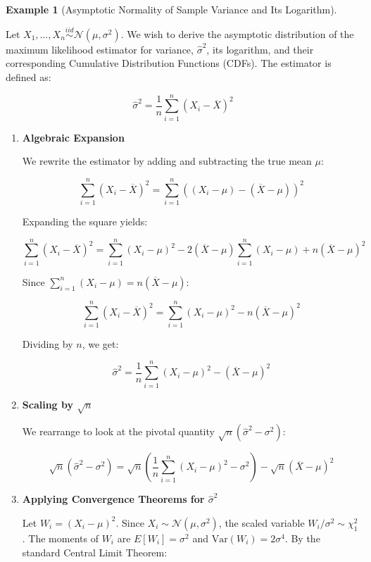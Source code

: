 \documentclass[
  letterpaper,
  DIV=11,
  numbers=noendperiod]{scrreprt}
\renewcommand{\[}{\begin{equation}}
\renewcommand{\]}{\end{equation}}
\theoremstyle{definition}
\theoremstyle{plain}
\theoremstyle{plain}
\theoremstyle{plain}
\theoremstyle{definition}
\newtheorem{example}{Example}[chapter]
\theoremstyle{plain}
\theoremstyle{remark}
\begin{document}
\begin{example}[Asymptotic Normality of Sample Variance and Its
Logarithm]\protect\hypertarget{exm-asymptotic-normal-variance}{}\label{exm-asymptotic-normal-variance}

Let \(X_1, \dots, X_n \overset{iid}{\sim} \mathcal{N}(\mu, \sigma^2)\).
We wish to derive the asymptotic distribution of the maximum likelihood
estimator for variance, \(\hat{\sigma}^2\), its logarithm, and their
corresponding Cumulative Distribution Functions (CDFs). The estimator is
defined as:

\[
\hat{\sigma}^2 = \frac{1}{n}\sum_{i=1}^n (X_i - \overline{X})^2
\]

\begin{enumerate}
\def\labelenumi{\arabic{enumi}.}
\item
  \textbf{Algebraic Expansion}

  We rewrite the estimator by adding and subtracting the true mean
  \(\mu\):

  \[
  \sum_{i=1}^n (X_i - \overline{X})^2 = \sum_{i=1}^n ((X_i - \mu) - (\overline{X} - \mu))^2
  \]

  Expanding the square yields:

  \[
  \sum_{i=1}^n (X_i - \overline{X})^2 = \sum_{i=1}^n (X_i - \mu)^2 - 2(\overline{X} - \mu)\sum_{i=1}^n(X_i - \mu) + n(\overline{X} - \mu)^2
  \]

  Since \(\sum_{i=1}^n(X_i - \mu) = n(\overline{X} - \mu)\):

  \[
  \sum_{i=1}^n (X_i - \overline{X})^2 = \sum_{i=1}^n (X_i - \mu)^2 - n(\overline{X} - \mu)^2
  \]

  Dividing by \(n\), we get:

  \[
  \hat{\sigma}^2 = \frac{1}{n}\sum_{i=1}^n (X_i - \mu)^2 - (\overline{X} - \mu)^2
  \]
\item
  \textbf{Scaling by \(\sqrt{n}\)}

  We rearrange to look at the pivotal quantity
  \(\sqrt{n}(\hat{\sigma}^2 - \sigma^2)\):

  \[
  \sqrt{n}(\hat{\sigma}^2 - \sigma^2) = \sqrt{n}\left( \frac{1}{n}\sum_{i=1}^n (X_i - \mu)^2 - \sigma^2 \right) - \sqrt{n}(\overline{X} - \mu)^2
  \]
\item
  \textbf{Applying Convergence Theorems for \(\hat{\sigma}^2\)}

  Let \(W_i = (X_i - \mu)^2\). Since
  \(X_i \sim \mathcal{N}(\mu, \sigma^2)\), the scaled variable
  \(W_i/\sigma^2 \sim \chi^2_1\). The moments of \(W_i\) are
  \(E[W_i] = \sigma^2\) and \(\text{Var}(W_i) = 2\sigma^4\). By the
  standard Central Limit Theorem:


\end{enumerate}
\end{example}
\end{document}
